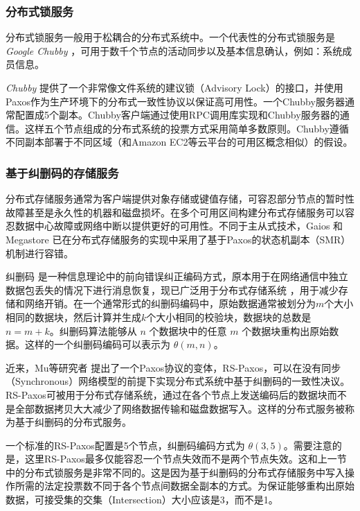 \subsubsection{分布式锁服务}
\label{subsection-case-dls}
分布式锁服务一般用于松耦合的分布式系统中。一个代表性的分布式锁服务是 \emph{Google Chubby} \cite{Burrows:2006:CLS:1298455.1298487}，可用于数千个节点的活动同步以及基本信息确认，例如：系统成员信息。

\emph{Chubby} 提供了一个非常像文件系统的建议锁（Advisory Lock）的接口，并使用Paxos作为生产环境下的分布式一致性协议以保证高可用性。一个Chubby服务器通常配置成5个副本。Chubby客户端通过使用RPC调用库实现和Chubby服务器的通信。这样五个节点组成的分布式系统的投票方式采用简单多数原则。Chubby遵循不同副本部署于不同区域（和Amazon EC2等云平台的可用区概念相似）的假设。

\subsubsection{基于纠删码的存储服务}
\label{subsubsec:dss}
分布式存储服务通常为客户端提供对象存储或键值存储，可容忍部分节点的暂时性故障甚至是永久性的机器和磁盘损坏。在多个可用区间构建分布式存储服务可以容忍数据中心故障或网络中断以提供更好的可用性。不同于主从式技术，Gaios \cite{Bolosky:2011:PRS:1972457.1972472} 和 Megastore \cite{baker2011megastore} 已在分布式存储服务的实现中采用了基于Paxos的状态机副本（SMR）机制进行容错。

纠删码 \cite{Rizzo:1997:EEC:263876.263881} 是一种信息理论中的前向错误纠正编码方式，原本用于在网络通信中独立数据包丢失的情况下进行消息恢复，现已广泛用于分布式存储系统 \cite{Huang:2012:ECW:2342821.2342823, Sathiamoorthy:2013:XEN:2488335.2488339}，用于减少存储和网络开销。在一个通常形式的纠删码编码中，原始数据通常被划分为$m$个大小相同的数据块，然后计算并生成$k$个大小相同的校验块，数据块的总数是 $n = m + k$。纠删码算法能够从 $n$ 个数据块中的任意 $m$ 个数据块重构出原始数据。这样的一个纠删码编码可以表示为 $\theta (m,n )$。

近来，Mu等研究者 \cite{Mu:2014:PME:2600212.2600218} 提出了一个Paxos协议的变体，RS-Paxos，可以在没有同步（Synchronous）网络模型的前提下实现分布式系统中基于纠删码的一致性决议。RS-Paxos可被用于分布式存储系统，通过在各个节点上发送编码后的数据块而不是全部数据拷贝大大减少了网络数据传输和磁盘数据写入。这样的分布式服务被称为基于纠删码的分布式服务。

一个标准的RS-Paxos配置是5个节点，纠删码编码方式为 $\theta(3, 5)$。需要注意的是，这里RS-Paxos最多仅能容忍一个节点失效而不是两个节点失效。这和上一节中的分布式锁服务是非常不同的。这是因为基于纠删码的分布式存储服务中写入操作所需的法定投票数不同于各个节点间数据全副本的方式。为保证能够重构出原始数据，可接受集的交集（Intersection）大小应该是3，而不是1。

